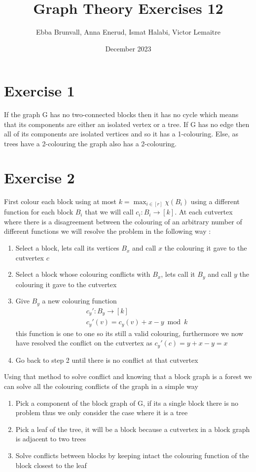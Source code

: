\documentclass{article}
\title{Graph Theory Exercises 12}
\author{Ebba Brunvall, Anna Enerud, Ismat Halabi, Victor Lemaitre}
\date{December 2023}
\begin{document}
\maketitle

\section*{Exercise 1}
If the graph G has no two-connected blocks then it has no cycle which means that its components are either an isolated vertex or a tree. If G has no edge then all of its components are isolated vertices and so it has a 1-colouring. Else, as trees have a 2-colouring the graph also has a 2-colouring. 

\section*{Exercise 2}
First colour each block using at most $k = \max_{i\in[r]} \chi(B_i)$ using a different function for each block $B_i$ that we will call $c_i : B_i \rightarrow [k]$.
At each cutvertex where there is a disagreement between the colouring of an arbitrary number of different functions we will resolve the problem in the following way :
\begin{enumerate}
\item Select a block, lets call its vertices $B_x$ and call $x$ the colouring it gave to the cutvertex $c$
\item Select a block whose colouring conflicts with $B_x$, lets call it $B_y$ and call $y$ the colouring it gave to the cutvertex
\item Give $B_y$ a new colouring function  
\begin{align*} 
&c_y' : B_y \rightarrow [k] \\ 
&c_y'(v) = c_y(v) + x-y \bmod{k}
\end{align*}
this function is one to one so its still a valid colouring, furthermore we now have resolved the conflict on the cutvertex as $c_y'(c) = y + x - y = x$
\item Go back to step 2 until there is no conflict at that cutvertex
\end{enumerate}

Using that method to solve conflict and knowing that a block graph is a forest we can solve all the colouring conflicts of the graph in a simple way 
\begin{enumerate}
\item Pick a component of the block graph of G, if its a single block there is no problem thus we only consider the case where it is a tree
\item Pick a leaf of the tree, it will be a block because a cutvertex in a block graph is adjacent to two trees
\item Solve conflicts between blocks by keeping intact the colouring function of the block closest to the leaf

\end{enumerate}
\end{document}
